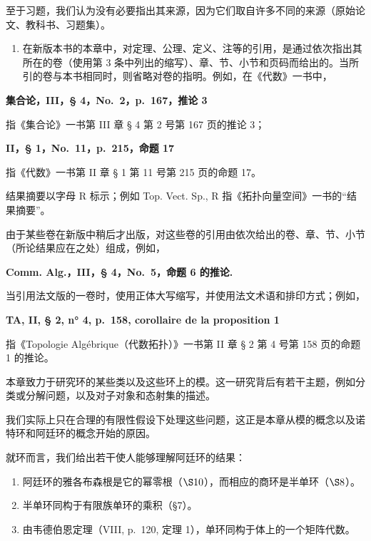 至于习题，我们认为没有必要指出其来源，因为它们取自许多不同的来源（原始论文、教科书、习题集）。

\begin{enumerate}
\def\labelenumi{\arabic{enumi}.}
\setcounter{enumi}{11}
\tightlist
\item
  在新版本书的本章中，对定理、公理、定义、注等的引用，是通过依次指出其所在的卷（使用第 3 条中列出的缩写）、章、节、小节和页码而给出的。当所引的卷与本书相同时，则省略对卷的指明。例如，在《代数》一书中，
\end{enumerate}

\textbf{集合论，III，§ 4，No.~2，p.~167，推论 3}

指《集合论》一书第 III 章 § 4 第 2 号第 167 页的推论 3；

\textbf{II，§ 1，No.~11，p.~215，命题 17}

指《代数》一书第 II 章 § 1 第 11 号第 215 页的命题 17。

结果摘要以字母 R 标示；例如 Top. Vect. Sp., R 指《拓扑向量空间》一书的``结果摘要''。

由于某些卷在新版中稍后才出版，对这些卷的引用由依次给出的卷、章、节、小节（所论结果应在之处）组成，例如，

\textbf{Comm. Alg.，III，§ 4，No.~5，命题 6 的推论.}

当引用法文版的一卷时，使用正体大写缩写，并使用法文术语和排印方式；例如，

\textbf{TA, II, § 2, n° 4, p.~158, corollaire de la proposition 1}

指《Topologie Algébrique（代数拓扑）》一书第 II 章 § 2 第 4 号第 158 页的命题 1 的推论。


本章致力于研究环的某些类以及这些环上的模。这一研究背后有若干主题，例如分类或分解问题，以及对子对象和态射集的描述。

我们实际上只在合理的有限性假设下处理这些问题，这正是本章从模的概念以及诺特环和阿廷环的概念开始的原因。

就环而言，我们给出若干使人能够理解阿廷环的结果：

\begin{enumerate}
\def\labelenumi{\alph{enumi})}
\item
  阿廷环的雅各布森根是它的幂零根（\(\S10\)），而相应的商环是半单环（\(\S8\)）。
\item
  半单环同构于有限族单环的乘积（§7）。
\item
  由韦德伯恩定理（VIII, p.~120, 定理 1），单环同构于体上的一个矩阵代数。
\end{enumerate}

